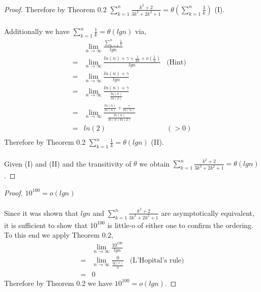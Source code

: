 \documentclass[12pt]{article}
\newenvironment{question}[2][Question]{\begin{trivlist}
\item[\hskip \labelsep {\bfseries #1}\hskip \labelsep {\bfseries #2.}]}{\end{trivlist}}
\begin{document}
\begin{question}{4}
\begin{proof}
    Therefore by Theorem 0.2 $\sum_{k=1}^{n}\frac{k^{2} + 2}{3k^{3} + 2k^{2} + 1} = \theta(\sum_{k=1}^{n}\frac{1}{k})$ (I).\\ \\
    Additionally we have $\sum_{k=1}^{n} \frac{1}{k} = \theta(lgn)$ via,
    \begin{align*}
      & \lim_{n\to\infty} \frac{
        \sum_{k=1}^{n} \frac{1}{k}
      }{lgn} &\\
      = & \lim_{n\to\infty} \frac{
        ln(n) + \gamma + \frac{1}{2n} + o(\frac{1}{n})
      }{lgn} & \text{(Hint)}\\
      = & \lim_{n\to\infty} \frac{
        ln(n) + \gamma
      }{lgn} & \\
      = & \lim_{n\to\infty} \frac{
        ln(n) + \gamma
      }{
        \frac{ln(n)}{ln(2)}
      } & \\
      = & \lim_{n\to\infty} \frac{
        \frac{ln(n)}{ln(n)} + \frac{\gamma}{ln(n)}
      }{
        \frac{ln(n)}{ln(n)ln(2)}
      } & \\
      = & ln(2) & (> 0)\\
    \end{align*}
    Therefore by Theorem 0.2 $\sum_{k=1}^{n}\frac{1}{k} = \theta(lgn)$ (II).\\ \\
    Given (I) and (II) and the transitivity of $\theta$ we obtain $\sum_{k=1}^{n}\frac{k^{2} + 2}{3k^{3} + 2k^{2} + 1} = \theta(lgn)$.
  \end{proof}

  \begin{proof} $10^{100} = o(lgn)$
    \leavevmode \\ \\
    Since it was shown that $lgn$ and $\sum_{k=1}^{n}\frac{k^{2} + 2}{3k^{3} + 2k^{2} + 1}$
    are asymptotically equivalent, it is sufficient to show that $10^{100}$ is little-o
    of either one to confirm the ordering.  To this end we apply Theorem 0.2,
    \begin{align*}
        & \lim_{n\to\infty} \frac{10^{100}}{lgn} &\\
      = & \lim_{n\to\infty} \frac{0}{\frac{lg(e)}{n}} & \text{(L'Hopital's rule)}\\
      = & 0 &
    \end{align*}
    Therefore by Theorem 0.2 we have $10^{100} = o(lgn)$.
  \end{proof}
\end{question}
\end{document}
